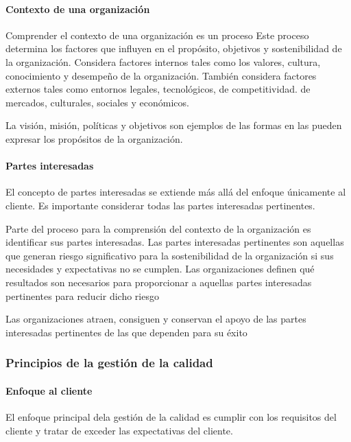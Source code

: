 				\paragraph{Contexto de una organización}
					Comprender el contexto de una organización es un proceso Este proceso determina los factores que
					influyen en el propósito, objetivos y sostenibilidad de la organización. Considera factores internos tales
					como los valores, cultura, conocimiento y desempeño de la organización. También considera factores
					externos tales como entornos legales, tecnológicos, de competitividad. de mercados, culturales, sociales
					y económicos.
					
					\newpage
					\thispagestyle{plain}
					
					\par	
						\noindent La visión, misión, políticas y objetivos son ejemplos de las formas en las pueden expresar los propósitos
						de la organización.
						
					\paragraph{Partes interesadas}
						El concepto de partes interesadas se extiende más allá del enfoque únicamente al cliente. Es importante
						considerar todas las partes interesadas pertinentes.
						
						\par 
							\noindent Parte del proceso para la comprensión del contexto de la organización es identificar sus partes
							interesadas. Las partes interesadas pertinentes son aquellas que generan riesgo significativo para la
							sostenibilidad de la organización si sus necesidades y expectativas no se cumplen. Las organizaciones
							definen qué resultados son necesarios para proporcionar a aquellas partes interesadas pertinentes para
							reducir dicho riesgo
							
						\par 
							\noindent Las organizaciones atraen, consiguen y conservan el apoyo de las partes interesadas pertinentes de las
							que dependen para su éxito
							
				\subsubsection{Principios de la gestión de la calidad}
					\paragraph{Enfoque al cliente}
						El enfoque principal dela gestión de la calidad es cumplir con los requisitos del cliente y tratar de exceder
						las expectativas del cliente.
